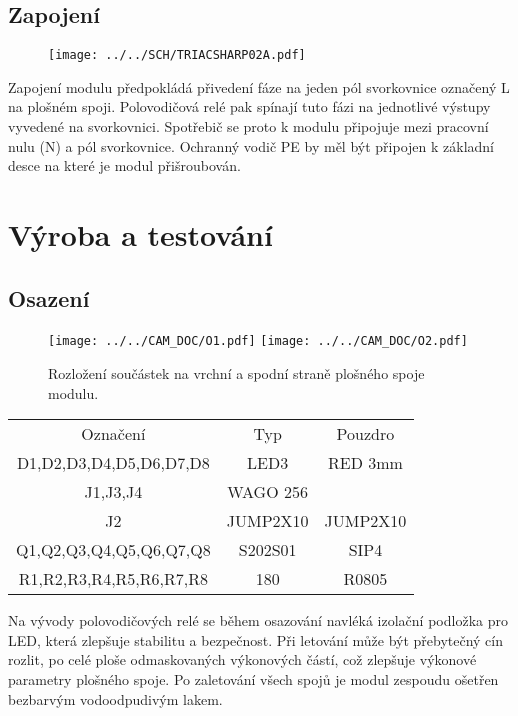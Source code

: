 \documentclass[12pt,a4paper,oneside]{article}
\begin{document}
\subsection{Zapojení}

\begin{figure} [htbp]
  \texttt{[image: ../../SCH/TRIACSHARP02A.pdf]}
\end{figure}

Zapojení modulu předpokládá přivedení fáze na jeden pól svorkovnice označený L na plošném spoji. Polovodičová relé pak spínají tuto fázi na jednotlivé výstupy vyvedené na svorkovnici. Spotřebič se proto k modulu připojuje mezi pracovní nulu (N) a pól svorkovnice. Ochranný vodič PE by měl být připojen k základní desce na které je modul přišroubován. 

\section{Výroba a testování}

\subsection{Osazení}

\begin{figure} [htbp]
  \texttt{[image: ../../CAM\_DOC/O1.pdf]}
  \texttt{[image: ../../CAM\_DOC/O2.pdf]}
  \caption{Rozložení součástek na vrchní a spodní straně plošného spoje modulu.}
\end{figure}


\begin{table}
\begin{tabular}{ccc}
Označení & Typ & Pouzdro\\ 
D1,D2,D3,D4,D5,D6,D7,D8	&	LED3		&	RED 3mm \\
J1,J3,J4	 & WAGO 256 & \\ 
J2 &		JUMP2X10		& JUMP2X10 \\
Q1,Q2,Q3,Q4,Q5,Q6,Q7,Q8	& S202S01	&	SIP4 \\
R1,R2,R3,R4,R5,R6,R7,R8 & 180	&  R0805 \\
\end{tabular} 
\end{table}


Na vývody polovodičových relé se během osazování navléká izolační podložka pro LED, která zlepšuje stabilitu a bezpečnost.  Při letování může být přebytečný cín rozlit, po celé ploše odmaskovaných výkonových částí, což zlepšuje výkonové parametry plošného spoje.  Po zaletování všech spojů je modul zespoudu ošetřen bezbarvým vodoodpudivým lakem. 
\end{document}
